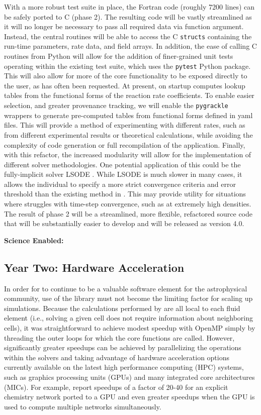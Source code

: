 With a more robust test suite in place, the Fortran code (roughly 7200
lines) can be safely ported to C (phase 2).  The resulting code will
be vastly streamlined as it will no longer be necessary to pass all
required data via function argument.  Instead, the central routines
will be able to access the C \texttt{structs} containing the run-time
parameters, rate data, and field arrays.  In addition, the ease of
calling C routines from Python will allow for the addition of
finer-grained unit tests operating within the existing test suite,
which uses the \texttt{pytest} Python package.  This will also allow
for more of the core functionality to be exposed directly to the user,
as has often been requested.
At present, on startup \grackle{} computes lookup tables from the
functional forms of the reaction rate coefficients.  To enable easier
selection, and greater provenance tracking, we will enable the
\texttt{pygrackle} wrappers to generate pre-computed tables from
functional forms defined in yaml files.  This will provide a method of
experimenting with different rates, such as from different
experimental results or theoretical calculations, while avoiding the
complexity of code generation or full recompilation of the
application.  Finally, with this refactor, the
increased modularity will allow for the implementation of different
solver methodologies.  One potential application of this could be the
fully-implicit solver LSODE \citep{LSODE}.  While LSODE is much slower in many
cases, it allows the individual to specify a more strict convergence
criteria and error threshold than the existing method in \grackle{}.
This may provide utility for situations where \grackle{} struggles
with time-step convergence, such as at extremely high densities.
The result of phase 2 will be a streamlined, more flexible,
refactored source code that will be substantially easier to develop
and will be released as \grackle{} version 4.0.

\textbf{Science Enabled:}

\subsection{Year Two: Hardware Acceleration}

In order for \grackle{} to continue to be a valuable software element
for the astrophysical community, use of the library must not become
the limiting factor for scaling up simulations.  Because the
calculations performed by \grackle{} are all local to each fluid
element (i.e., solving a given cell does not require information about
neighboring cells), it was straightforward to achieve modest speedup
with OpenMP simply by threading the outer loops for which the core
functions are called.  However, significantly greater speedups can be
achieved by parallelizing the operations within the solvers and taking
advantage of hardware acceleration options currently available on the
latest high performance computing (HPC) systems, such as graphics
processing units (GPUs) and many integrated core architectures (MICs).
For example, \citet{Haidar2016PerformanceAA} report speedups of a
factor of 20-40
for an explicit chemistry network ported to a GPU and even greater
speedups when the GPU is used to compute multiple networks
simultaneously.

